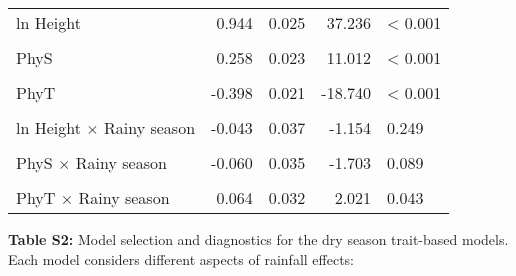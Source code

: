 \documentclass[
  12pt,
  letterpaper,
  DIV=11,
  numbers=noendperiod]{scrartcl}
\begin{document}
\begin{longtable*}[t]{lrrrl}
\hspace{1em}ln Height & 0.944 & 0.025 & 37.236 & < 0.001\\
\hspace{1em} &  &  &  & \\
\hspace{1em}PhyS & 0.258 & 0.023 & 11.012 & < 0.001\\
\hspace{1em} &  &  &  & \\
\hspace{1em}PhyT & -0.398 & 0.021 & -18.740 & < 0.001\\
\hspace{1em} &  &  &  & \\
\hspace{1em}ln Height $\times$ Rainy season & -0.043 & 0.037 & -1.154 & 0.249\\
\hspace{1em} &  &  &  & \\
\hspace{1em}PhyS $\times$ Rainy season & -0.060 & 0.035 & -1.703 & 0.089\\
\hspace{1em} &  &  &  & \\
\hspace{1em}PhyT $\times$ Rainy season & 0.064 & 0.032 & 2.021 & 0.043\\*
\end{longtable*}

\newpage

\textbf{Table S2:} Model selection and diagnostics for the dry season
trait-based models. Each model considers different aspects of rainfall
effects:
\end{document}

